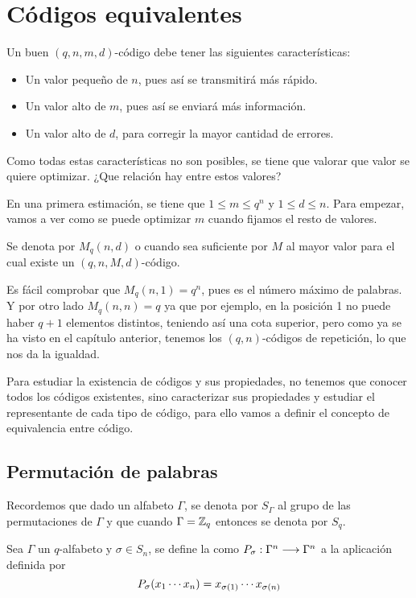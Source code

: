 \section{Códigos equivalentes}

Un buen $(q, n, m, d)$-código debe tener las siguientes características:
\begin{itemize}
	\item Un valor pequeño de $n$, pues así se transmitirá más rápido.
	\item Un valor alto de $m$, pues así se enviará más información.
	\item Un valor alto de $d$, para corregir la mayor cantidad de errores.
\end{itemize}

Como todas estas características no son posibles, se tiene que valorar que valor se quiere optimizar.
¿Que relación hay entre estos valores?

En una primera estimación, se tiene que $1\leq m\leq q^n$ y $1\leq d\leq n$.
Para empezar, vamos a ver como se puede optimizar $m$ cuando fijamos el resto de valores.

\begin{definition}
	Se denota por $M_q(n, d)$ o cuando sea suficiente por $M$ al mayor valor para el cual existe un $(q, n, M, d)$-código.
\end{definition}

Es fácil comprobar que $M_q(n, 1)=q^n$, pues es el número máximo de palabras.
Y por otro lado $M_q(n, n)=q$ ya que por ejemplo, en la posición 1 no puede haber $q+1$ elementos distintos, teniendo así una cota superior, pero como ya se ha visto en el capítulo anterior, tenemos los $(q, n)$-códigos de repetición, lo que nos da la igualdad.

Para estudiar la existencia de códigos y sus propiedades, no tenemos que conocer todos los códigos existentes, sino caracterizar sus propiedades y estudiar el representante de cada tipo de código, para ello vamos a definir el concepto de equivalencia entre código.

\subsection{Permutación de palabras}
Recordemos que dado un alfabeto $\Gamma$, se denota por $S_\Gamma$ al grupo de las permutaciones de $\Gamma$ y que cuando $\Gamma = \mathbb{Z}_q$ entonces se denota por $S_q$.

\begin{definition}
	Sea $\Gamma$ un $q$-alfabeto y $\sigma\in S_n$, se define la  como $P_{\sigma}:\Gamma^n\longrightarrow \Gamma^n$ a la aplicación definida por
	\[
		P_{\sigma}(x_1\cdots x_{n})=x_{\sigma(1)}\cdots x_{\sigma(n)}
	\]
\end{definition}

